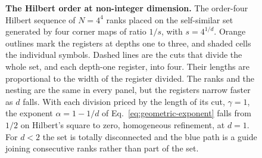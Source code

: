 \begin{figure}[t]
  \caption{\textbf{The Hilbert order at non-integer dimension.} The
    order-four Hilbert sequence of $N=4^4$ ranks placed on the
    self-similar set generated by four corner maps of ratio $1/s$, with
    $s=4^{1/d}$. Orange outlines mark the registers at depths one to
    three, and shaded cells the individual symbols. Dashed lines are the
    cuts that divide the whole set, and each depth-one register, into
    four. Their lengths are proportional to the width of the register
    divided. The ranks and the nesting are the same in every panel, but
    the registers narrow faster as $d$ falls. With each division priced
    by the length of its cut, $\gamma=1$, the exponent $\alpha=1-1/d$ of
    Eq.~\eqref{eq:geometric-exponent} falls from $1/2$ on Hilbert's
    square to zero, homogeneous refinement, at $d=1$. For $d<2$ the set
    is totally disconnected and the blue path is a guide joining
    consecutive ranks rather than part of the set.}
  \label{fig:fractional-hilbert}
\end{figure}